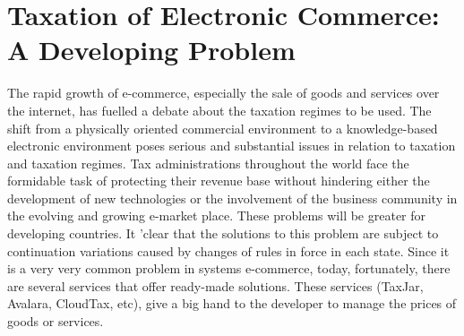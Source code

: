 \section{Taxation of Electronic Commerce: A Developing Problem}
\label{sec:taxation_overview}
The rapid growth of e-commerce, especially the sale of goods and services over the internet, has fuelled a debate about the taxation regimes to be used.
\newline
The shift from a physically oriented commercial environment to a knowledge-based electronic environment poses serious and substantial issues in relation to taxation and taxation regimes. Tax administrations throughout the world face the formidable task of protecting their revenue base without hindering either the development of new technologies or the involvement of the business community in the evolving and growing e-market place.
These problems will be greater for developing countries.
\newline
It 'clear that the solutions to this problem are subject to continuation variations caused by changes of rules in force in each state.
\newline
Since it is a very very common problem in systems e-commerce, today, fortunately, there are several services that offer ready-made solutions.
\newline
These services (TaxJar, Avalara, CloudTax, etc), give a big hand to the developer to manage the prices of goods or services.
